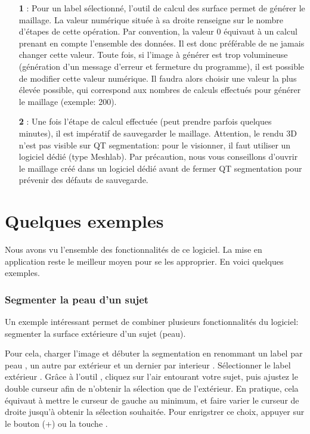 \documentclass {article}
\begin{document}
\begin{itemize}
	\item[\textbf{1}]: Pour un label sélectionné, l'outil de calcul des surface permet de générer le maillage. La valeur numérique située à sa droite renseigne sur le nombre d'étapes de cette opération. Par convention, la valeur 0 équivaut à un calcul prenant en compte l'ensemble des données. Il est donc préférable de ne jamais changer cette valeur. Toute fois, si l'image à générer est trop volumineuse (génération d'un message d'erreur et fermeture du programme), il est possible de modifier cette valeur numérique. Il faudra alors choisir une valeur la plus élevée possible, qui correspond aux nombres de calculs effectués pour générer le maillage (exemple: 200).
	\item[\textbf{2}]: Une fois l'étape de calcul effectuée (peut prendre parfois quelques minutes), il est impératif de sauvegarder le maillage. Attention, le rendu 3D n'est pas visible sur QT segmentation: pour le visionner, il faut utiliser un logiciel dédié (type Meshlab). Par précaution, nous vous conseillons d'ouvrir le maillage créé dans un logiciel dédié avant de fermer QT segmentation pour prévenir des défauts de sauvegarde.

	
\end{itemize}

\part{Quelques exemples}

Nous avons vu l'ensemble des fonctionnalités de ce logiciel. La mise en application reste le meilleur moyen pour se les approprier. En voici quelques exemples.

\section{Segmenter la peau d'un sujet}

Un exemple intéressant permet de combiner plusieurs fonctionnalités du logiciel: segmenter la surface extérieure d'un sujet (peau).

Pour cela, charger l'image et débuter la segmentation en renommant un label par \og peau \fg , un autre par \og extérieur \fg et un dernier par \og interieur \fg . Sélectionner le label \og extérieur \fg . Grâce à l'outil , cliquez sur l'air entourant votre sujet, puis ajustez le double curseur afin de n'obtenir la sélection que de l'extérieur. En pratique, cela équivaut à mettre le curseur de gauche au minimum, et faire varier le curseur de droite jusqu'à obtenir la sélection souhaitée. Pour enrigstrer ce choix, appuyer sur le bouton (+) ou la touche .
\end{document}
